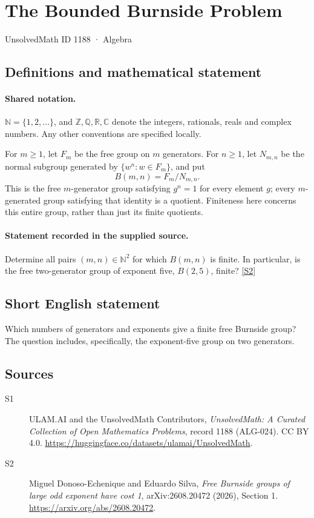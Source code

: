 \documentclass[11pt]{article}
\newcommand{\sref}[2]{\hyperlink{source:#1:#2}{[S#2]}}
\begin{document}
\setcounter{section}{1187}
\section{The Bounded Burnside Problem}\label{1188}
{\small\sffamily UnsolvedMath ID 1188 · Algebra}
\subsection{Definitions and mathematical statement}

\paragraph{Shared notation.}$\mathbb N=\{1,2,\ldots\}$, and $\mathbb Z,\mathbb Q,\mathbb R,\mathbb C$ denote the integers, rationals, reals and complex numbers. Any other conventions are specified locally.


For \(m\ge1\), let \(F_m\) be the free group on \(m\) generators.
For \(n\ge1\), let \(N_{m,n}\) be the normal subgroup generated by
\(\{w^n:w\in F_m\}\), and put
\[
 B(m,n)=F_m/N_{m,n}.
\]
This is the free \(m\)-generator group satisfying \(g^n=1\) for every
element \(g\); every \(m\)-generated group satisfying that identity is a quotient.
Finiteness here concerns this entire group, rather than just its finite quotients.
\paragraph{Statement recorded in the supplied source.}
Determine all pairs \((m,n)\in\mathbb N^2\) for which
\(B(m,n)\) is finite.  In particular, is the free two-generator
group of exponent five, \(B(2,5)\), finite? \sref{1188}{2}
\subsection{Short English statement}
Which numbers of generators and exponents give a finite free Burnside group? The question includes, specifically, the exponent-five group on two generators.
\subsection{Sources}
\begin{description}
\item[\hypertarget{source:1188:1}{S1}] ULAM.AI and the UnsolvedMath Contributors, \emph{UnsolvedMath: A Curated Collection of Open Mathematics Problems}, record 1188 (ALG-024). CC BY 4.0. \url{https://huggingface.co/datasets/ulamai/UnsolvedMath}.
\item[\hypertarget{source:1188:2}{S2}] Miguel Donoso-Echenique and Eduardo Silva, \emph{Free Burnside groups of large odd exponent have cost 1}, arXiv:2608.20472 (2026), Section 1. \url{https://arxiv.org/abs/2608.20472}.
\end{description}
\label{end:1188}
\end{document}
